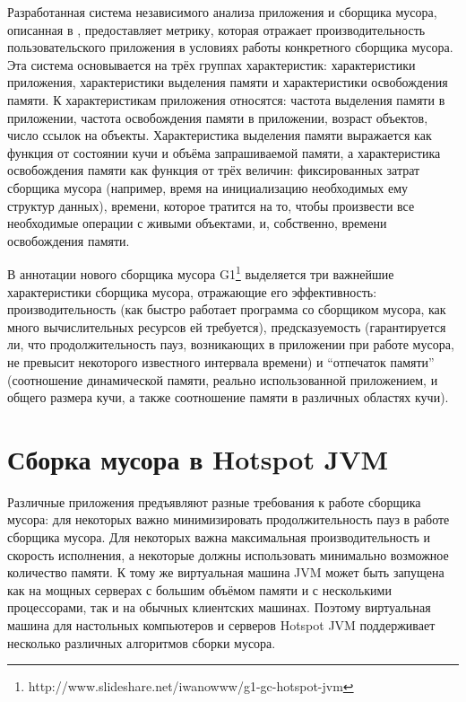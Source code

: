 Разработанная система независимого анализа приложения и сборщика мусора,
описанная в \cite{book:HBench}, предоставляет метрику, которая отражает производительность
пользовательского приложения в условиях работы конкретного сборщика мусора. Эта система
основывается на трёх группах характеристик: характеристики приложения, характеристики 
выделения памяти и характеристики освобождения памяти. К характеристикам приложения
относятся: частота выделения памяти в приложении, частота освобождения памяти в приложении,
возраст объектов, число ссылок на объекты. Характеристика выделения памяти выражается
как функция от состоянии кучи и объёма запрашиваемой памяти, а характеристика освобождения
памяти как функция от трёх величин: фиксированных затрат сборщика мусора (например,
время на инициализацию необходимых ему структур данных), времени, которое тратится
на то, чтобы произвести все необходимые операции с живыми объектами, и, собственно,
времени освобождения памяти.

В аннотации нового сборщика мусора G1\footnote{http://www.slideshare.net/iwanowww/g1-gc-hotspot-jvm}
выделяется три важнейшие характеристики сборщика мусора, отражающие его эффективность:
производительность (как быстро работает программа со сборщиком мусора, как много
вычислительных ресурсов ей требуется), предсказуемость (гарантируется ли, что продолжительность 
пауз, возникающих в приложении при работе мусора, не превысит некоторого известного
интервала времени) и ``отпечаток памяти'' (соотношение динамической памяти, реально
использованной приложением, и общего размера кучи, а также соотношение памяти в различных 
областях кучи).


\section {Сборка мусора в Hotspot JVM}

Различные приложения предъявляют разные требования к работе сборщика мусора: для некоторых важно минимизировать
продолжительность пауз в работе сборщика мусора. Для некоторых важна максимальная 
производительность и скорость исполнения, а некоторые должны использовать минимально
возможное количество памяти. К тому же виртуальная машина JVM может быть запущена
как на мощных серверах с большим объёмом памяти и с несколькими процессорами, так и на 
обычных клиентских машинах. Поэтому виртуальная машина для настольных компьютеров и серверов
Hotspot JVM поддерживает несколько различных алгоритмов сборки
мусора.

